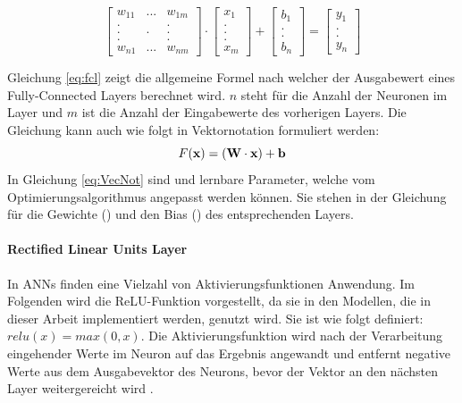 \begin{equation}
\label{eq:fcl}
\begin{bmatrix}
w_{11} & ... & w_{1m}\\
. &  & .\\
. & . & .\\
. &  & .\\
w_{n1} & ... & w_{nm} 
\end{bmatrix} \cdot
\begin{bmatrix}
x_1\\
.\\
.\\
.\\
x_m
\end{bmatrix} + 
\begin{bmatrix}
b_1\\
.\\
.\\
b_n
\end{bmatrix} = 
\begin{bmatrix}
y_1\\
.\\
.\\
y_n
\end{bmatrix}
\end{equation}

Gleichung \ref{eq:fcl} zeigt die allgemeine Formel nach welcher der Ausgabewert eines Fully-Connected Layers berechnet wird. $n$ steht für die Anzahl der Neuronen im Layer und $m$ ist die Anzahl der Eingabewerte des vorherigen Layers. Die Gleichung kann auch wie folgt in Vektornotation formuliert werden: 
\begin{equation}
\label{eq:VecNot}
F(\vect{x}) = (\mat{W} \cdot \vect{x}) + \vect{b}
\end{equation} 
In Gleichung \ref{eq:VecNot} sind  und  lernbare Parameter, welche vom Optimierungsalgorithmus angepasst werden können. Sie stehen in der Gleichung für die Gewichte () und den Bias () des entsprechenden Layers.

\paragraph{Rectified Linear Units Layer}

In ANNs finden eine Vielzahl von Aktivierungsfunktionen Anwendung. Im Folgenden wird die ReLU-Funktion vorgestellt, da sie in den Modellen, die in dieser Arbeit implementiert werden, genutzt wird. Sie ist wie folgt definiert: $relu(x) = max(0, x)$. Die Aktivierungsfunktion wird nach der Verarbeitung eingehender Werte im Neuron auf das Ergebnis angewandt und entfernt negative Werte aus dem Ausgabevektor des Neurons, bevor der Vektor an den nächsten Layer weitergereicht wird \parencite{Wu.2017}.

